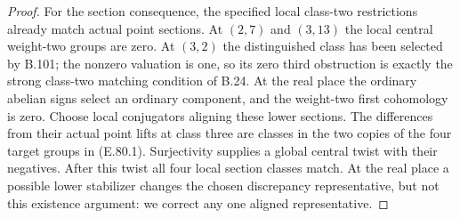 \begin{proof}
For the section consequence, the specified local class-two
restrictions already match actual point sections. At $(2,7)$
and $(3,13)$ the local central weight-two groups are zero. At
$(3,2)$ the distinguished class has been selected by B.101;
the nonzero valuation is one, so its zero third obstruction is
exactly the strong class-two matching condition of B.24. At the
real place the ordinary abelian signs select an ordinary
component, and the weight-two first cohomology is zero.
Choose local conjugators aligning these lower sections. The
differences from their actual point lifts at class three are
classes in the two copies of the four target groups in
(E.80.1). Surjectivity supplies a global central twist with
their negatives. After this twist all four local section
classes match. At the real place a possible lower stabilizer
changes the chosen discrepancy representative, but not this
existence argument: we correct any one aligned representative.
\end{proof}

